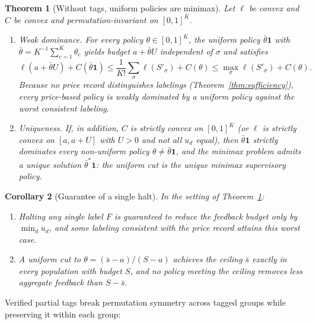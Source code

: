 \documentclass[11pt,letterpaper]{article}
\newtheorem{theorem}{Theorem}[section]
\newtheorem{corollary}[theorem]{Corollary}
\theoremstyle{definition}
\begin{document}
\begin{theorem}[Without tags, uniform policies are minimax]\label{thm:minimax}
Let $\ell$ be convex and $C$ be convex and permutation-invariant on $[0, 1]^K$.
\begin{enumerate}
  \item[(i)] \emph{Weak dominance.} For every policy $\theta \in [0, 1]^K$, the uniform policy $\bar{\theta}\mathbf{1}$ with $\bar{\theta} = K^{-1}\sum_{c=1}^K \theta_c$ yields budget $a + \bar{\theta} U$ independent of $\sigma$ and satisfies
  \[
    \ell(a + \bar{\theta} U) + C(\bar{\theta}\mathbf{1})
    \le \frac{1}{K!} \sum_{\sigma} \ell(S'_\sigma) + C(\theta)
    \le \max_{\sigma} \ell(S'_\sigma) + C(\theta).
  \]
  Because no price record distinguishes labelings (Theorem~\ref{thm:sufficiency}), every price-based policy is weakly dominated by a uniform policy against the worst consistent labeling.
  \item[(ii)] \emph{Uniqueness.} If, in addition, $C$ is strictly convex on $[0, 1]^K$ (or $\ell$ is strictly convex on $[a, a + U]$ with $U > 0$ and not all $u_d$ equal), then $\bar{\theta}\mathbf{1}$ strictly dominates every non-uniform policy $\theta \neq \bar{\theta}\mathbf{1}$, and the minimax problem admits a unique solution $\bar{\theta}^*\mathbf{1}$: the uniform cut is the unique minimax supervisory policy.
\end{enumerate}
\end{theorem}

\begin{corollary}[Guarantee of a single halt]\label{cor:halt}
In the setting of Theorem~\ref{thm:minimax}:
\begin{enumerate}
  \item[(i)] Halting any single label $F$ is guaranteed to reduce the feedback budget only by $\min_d u_d$, and some labeling consistent with the price record attains this worst case.
  \item[(ii)] A uniform cut to $\theta = (\bar{s} - a)/(S - a)$ achieves the ceiling $\bar{s}$ exactly in every population with budget $S$, and no policy meeting the ceiling removes less aggregate feedback than $S - \bar{s}$.
\end{enumerate}
\end{corollary}

Verified partial tags break permutation symmetry across tagged groups while preserving it within each group:
\end{document}
